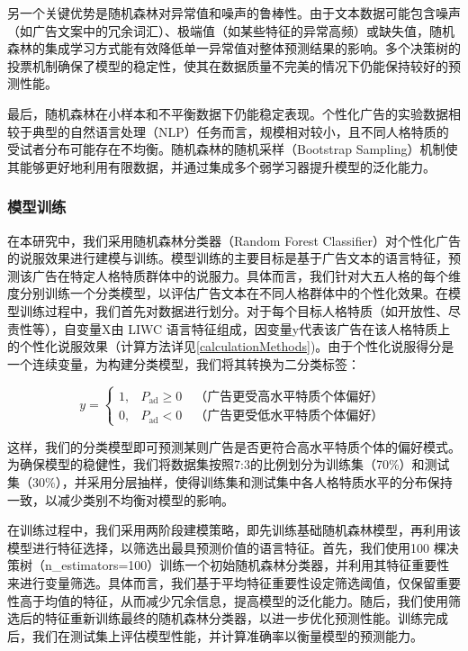 另一个关键优势是随机森林对异常值和噪声的鲁棒性。由于文本数据可能包含噪声（如广告文案中的冗余词汇）、极端值（如某些特征的异常高频）或缺失值，随机森林的集成学习方式能有效降低单一异常值对整体预测结果的影响。多个决策树的投票机制确保了模型的稳定性，使其在数据质量不完美的情况下仍能保持较好的预测性能。

最后，随机森林在小样本和不平衡数据下仍能稳定表现。个性化广告的实验数据相较于典型的自然语言处理（NLP）任务而言，规模相对较小，且不同人格特质的受试者分布可能存在不均衡。随机森林的随机采样（Bootstrap Sampling）机制使其能够更好地利用有限数据，并通过集成多个弱学习器提升模型的泛化能力。

\subsubsection{模型训练}
在本研究中，我们采用随机森林分类器（Random Forest Classifier）对个性化广告的说服效果进行建模与训练。模型训练的主要目标是基于广告文本的语言特征，预测该广告在特定人格特质群体中的说服力。具体而言，我们针对大五人格的每个维度分别训练一个分类模型，以评估广告文本在不同人格群体中的个性化效果。在模型训练过程中，我们首先对数据进行划分。对于每个目标人格特质（如开放性、尽责性等），自变量X由 LIWC 语言特征组成，因变量y代表该广告在该人格特质上的个性化说服效果（计算方法详见\ref{calculationMethods})。由于个性化说服得分是一个连续变量，为构建分类模型，我们将其转换为二分类标签：

\begin{equation}
y =
\begin{cases}
1, & P_{\text{ad}} \geq 0 \quad \text{（广告更受高水平特质个体偏好）} \\
0, & P_{\text{ad}} < 0 \quad \text{（广告更受低水平特质个体偏好）}
\end{cases}
\end{equation}

这样，我们的分类模型即可预测某则广告是否更符合高水平特质个体的偏好模式。为确保模型的稳健性，我们将数据集按照7:3的比例划分为训练集（70\%）和测试集（30\%），并采用分层抽样，使得训练集和测试集中各人格特质水平的分布保持一致，以减少类别不均衡对模型的影响。

在训练过程中，我们采用两阶段建模策略，即先训练基础随机森林模型，再利用该模型进行特征选择，以筛选出最具预测价值的语言特征。首先，我们使用100 棵决策树（n\_estimators=100）训练一个初始随机森林分类器，并利用其特征重要性来进行变量筛选。具体而言，我们基于平均特征重要性设定筛选阈值，仅保留重要性高于均值的特征，从而减少冗余信息，提高模型的泛化能力。随后，我们使用筛选后的特征重新训练最终的随机森林分类器，以进一步优化预测性能。训练完成后，我们在测试集上评估模型性能，并计算准确率以衡量模型的预测能力。

